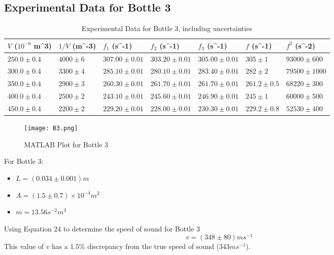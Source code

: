 \documentclass[10pt, a4paper]{article}
\begin{document}
\subsection*{Experimental Data for Bottle 3}
\begin{table}[H]
\centering
\def\arraystretch{1.6}
\begin{tabular}{|l|l|l|l|l|l|l|}
\hline
$V$ ($10^{-6}$ m^3) & $1/V$ (m^{-3}) & $f_1$ (s^{-1})        & $f_2$ (s^{-1})        & $f_3$ (s^{-1})        & $f$ (s^{-1}) & $f^2$ (s^{-2})   \\ \hline
$250.0 \pm 0.4$                                         & $4000 \pm 6$                   & $307.00 \pm 0.01$ & $303.20 \pm 0.01$ & $305.00 \pm 0.01$ & $305 \pm 1$ & $93000 \pm 600$ \\\hline
$300.0 \pm 0.4$                                         & $3300 \pm 4$                   & $285.10 \pm 0.01$ & $280.10 \pm 0.01$ & $283.40 \pm 0.01$ & $282 \pm 2$ & $79500 \pm 1000$ \\\hline
$350.0 \pm 0.4$                                        & $2900 \pm 3$                    & $260.30 \pm 0.01$ & $261.70 \pm 0.01$ & $261.70 \pm 0.01$ & $261.2 \pm 0.5$ & $68220 \pm 300$ \\ \hline
$400.0 \pm 0.4$                                        & $2500 \pm 2$                    & $243.10 \pm 0.01$ & $245.60 \pm 0.01$  & $246.90 \pm 0.01$  & $245 \pm 1$ & $60000 \pm 500$ \\ \hline
$450.0 \pm 0.4$                                        & $2200 \pm 2$                    & $229.20 \pm 0.01$ & $228.00 \pm 0.01$ & $230.30 \pm 0.01$ & $229.2 \pm 0.8$ & $52530 \pm 400$ \\ \hline
\end{tabular}
\caption{Experimental Data for Bottle 3, including uncertainties}
\end{table}

\begin{figure}[H]
    \centering
    \texttt{[image: B3.png]}
    \caption{MATLAB Plot for Bottle 3}
\end{figure}

For Bottle 3: 
\begin{itemize}
\item $L = (0.034 \pm 0.001) \si{m}$ 
\item $A = (1.5 \pm 0.7) \times 10^{-4}\si{m^2}$
\item $m = 13.56 \si{s^{-2}m^{3}}$
\end{itemize}
Using Equation 24 to determine the speed of sound for Bottle 3
$$\boxed{v = (348 \pm 80) \si{ms^{-1}}}$$
This value of $v$ has a 1.5\% discrepancy from the true speed of sound ($343 \si{ms^{-1}}$).
\end{document}
